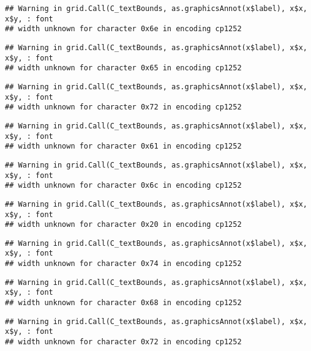 \documentclass[
]{article}
\begin{document}
\begin{verbatim}
## Warning in grid.Call(C_textBounds, as.graphicsAnnot(x$label), x$x, x$y, : font
## width unknown for character 0x6e in encoding cp1252
\end{verbatim}

\begin{verbatim}
## Warning in grid.Call(C_textBounds, as.graphicsAnnot(x$label), x$x, x$y, : font
## width unknown for character 0x65 in encoding cp1252
\end{verbatim}

\begin{verbatim}
## Warning in grid.Call(C_textBounds, as.graphicsAnnot(x$label), x$x, x$y, : font
## width unknown for character 0x72 in encoding cp1252
\end{verbatim}

\begin{verbatim}
## Warning in grid.Call(C_textBounds, as.graphicsAnnot(x$label), x$x, x$y, : font
## width unknown for character 0x61 in encoding cp1252
\end{verbatim}

\begin{verbatim}
## Warning in grid.Call(C_textBounds, as.graphicsAnnot(x$label), x$x, x$y, : font
## width unknown for character 0x6c in encoding cp1252
\end{verbatim}

\begin{verbatim}
## Warning in grid.Call(C_textBounds, as.graphicsAnnot(x$label), x$x, x$y, : font
## width unknown for character 0x20 in encoding cp1252
\end{verbatim}

\begin{verbatim}
## Warning in grid.Call(C_textBounds, as.graphicsAnnot(x$label), x$x, x$y, : font
## width unknown for character 0x74 in encoding cp1252
\end{verbatim}

\begin{verbatim}
## Warning in grid.Call(C_textBounds, as.graphicsAnnot(x$label), x$x, x$y, : font
## width unknown for character 0x68 in encoding cp1252
\end{verbatim}

\begin{verbatim}
## Warning in grid.Call(C_textBounds, as.graphicsAnnot(x$label), x$x, x$y, : font
## width unknown for character 0x72 in encoding cp1252
\end{verbatim}
\end{document}
